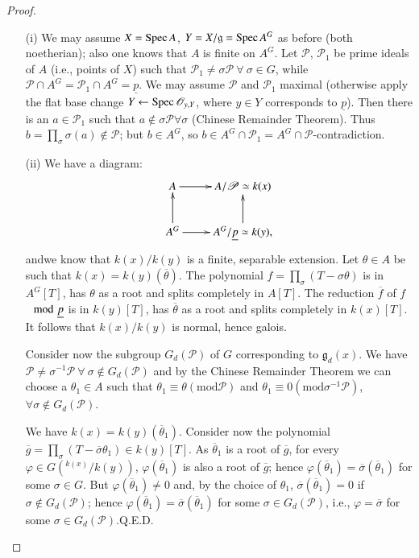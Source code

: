 \begin{proof}
\begin{itemize}
\item[\rm(i)] We may assume $X=\operatorname{Spec} A$, $Y=X/\mathfrak{g}=\operatorname{Spec} A^{G}$
  as before (both noetherian); also one knows that $A$ is finite on
  $A^{G}$. Let $\mathscr{P}$, $\mathscr{P}_{1}$ be prime ideals of $A$
  (i.e., points of $X$) such that $\mathscr{P}_{1}\neq
  \sigma\mathscr{P}\ \forall\ \sigma \in G$, while $\mathscr{P}\cap
  A^{G}=\mathscr{P}_{1}\cap A^{G}=\underline{p}$. We may assume
  $\mathscr{P}$ and $\mathscr{P}_{1}$ maximal (otherwise apply the
  flat base change $Y\leftarrow \operatorname{Spec} \mathscr{O}_{y,Y}$, where $y\in
  Y$ corresponds to $\underline{p}$). Then there is an $a\in
  \mathscr{P}_{1}$ such that $a\not\in \sigma \mathscr{P}\forall
  \sigma$ (Chinese Remainder Theorem). Thus
  $b=\prod\limits_{\sigma}\sigma(a)\not\in \mathscr{P}$; but $b\in
  A^{G}$, so $b\in A^{G}\cap \mathscr{P}_{1}=A^{G}\cap
  \mathscr{P}$-contradiction. 

\item[\rm(ii)] We have a diagram:
\[
\xymatrix{
A\ar[r] & A/\mathscr{P}\simeq k(x)\\
A^{G}\ar[u]\ar[r] & A^{G}/\ub{p}\simeq k(y),\ar[u]
}
\]
and\pageoriginale we know that $k(x)/k(y)$ is a finite, separable
extension. Let $\theta\in A$ be such that
$k(x)=k(y)(\overline{\theta})$. The polynomial
$f=\prod\limits_{\sigma}(T-\sigma \theta)$ is in $A^{G}[T]$, has
$\theta$ as a root and splits completely in $A[T]$. The reduction
$\overline{f}$ of $f$ $\mod \ub{p}$ is in $k(y)[T]$, has
$\overline{\theta}$ as a root and splits completely in $k(x)[T]$. It
follows that $k(x)/k(y)$ is normal, hence galois. 

Consider now the subgroup $G_{d}(\mathscr{P})$ of $G$ corresponding to
$\mathfrak{g}_{d}(x)$. We have $\mathscr{P}\neq
\sigma^{-1}\mathscr{P}\ \forall\ \sigma \not\in G_{d}(\mathscr{P})$ and
by the Chinese Remainder Theorem we can choose a $\theta_{1}\in A$
such that $\theta_{1}\equiv \theta(\text{mod}\mathscr{P})$ and
$\theta_{1}\equiv 0(\text{mod} \sigma^{-1}\mathscr{P})$, $\forall
\sigma\not\in G_{d}(\mathscr{P})$. 

We have $k(x)=k(y)(\overline{\theta}_{1})$. Consider now the
polynomial
$\overline{g}=\prod\limits_{\sigma}(T-\overline{\sigma}\theta_{1})\in
  k(y)[T]$. As $\overline{\theta}_{1}$ is a root of $\overline{g}$,
  for every $\varphi\in G(^{k(x)}/k(y))$,
  $\varphi(\overline{\theta}_{1})$ is also a root of $\overline{g}$;
  hence
  $\varphi(\overline{\theta}_{1})=\overline{\sigma}(\overline{\theta}_{1})$
  for some $\sigma \in G$. But $\varphi(\overline{\theta}_{1})\neq 0$
  and, by the choice of $\theta_{1}$,
  $\overline{\sigma}(\overline{\theta}_{1})=0$ if $\sigma\not\in
  G_{d}(\mathscr{P})$; hence
  $\varphi(\overline{\theta}_{1})=\overline{\sigma}(\overline{\theta}_{1})$
  for some $\sigma\in G_{d}(\mathscr{P})$, i.e.,
  $\varphi=\overline{\sigma}$ for some $\sigma \in
  G_{d}(\mathscr{P})$.\hfill Q.E.D.
\end{itemize}
\end{proof}


